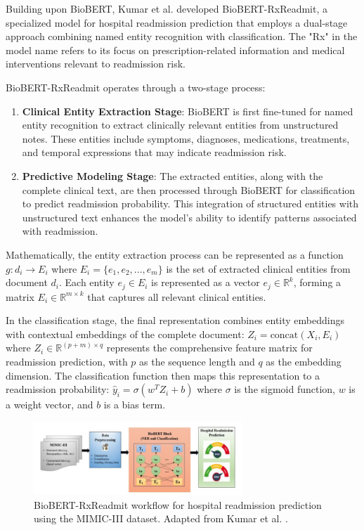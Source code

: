 \documentclass[3p,times,procedia]{elsarticle}
\begin{document}
Building upon BioBERT, Kumar et al. \cite{Kumar2025} developed BioBERT-RxReadmit, a specialized model for hospital readmission prediction that employs a dual-stage approach combining named entity recognition with classification. The "Rx" in the model name refers to its focus on prescription-related information and medical interventions relevant to readmission risk.

BioBERT-RxReadmit operates through a two-stage process:

\begin{enumerate}
    \item \textbf{Clinical Entity Extraction Stage}: BioBERT is first fine-tuned for named entity recognition to extract clinically relevant entities from unstructured notes. These entities include symptoms, diagnoses, medications, treatments, and temporal expressions that may indicate readmission risk.
    
    \item \textbf{Predictive Modeling Stage}: The extracted entities, along with the complete clinical text, are then processed through BioBERT for classification to predict readmission probability. This integration of structured entities with unstructured text enhances the model's ability to identify patterns associated with readmission.
\end{enumerate}

Mathematically, the entity extraction process can be represented as a function $g: d_i \rightarrow E_i$ where $E_i = \{e_1, e_2, ..., e_m\}$ is the set of extracted clinical entities from document $d_i$. Each entity $e_j \in E_i$ is represented as a vector $e_j \in \mathbb{R}^k$, forming a matrix $E_i \in \mathbb{R}^{m \times k}$ that captures all relevant clinical entities.

In the classification stage, the final representation combines entity embeddings with contextual embeddings of the complete document: $Z_i = \text{concat}(X_i, E_i)$ where $Z_i \in \mathbb{R}^{(p + m) \times q}$ represents the comprehensive feature matrix for readmission prediction, with $p$ as the sequence length and $q$ as the embedding dimension. The classification function then maps this representation to a readmission probability: $\hat{y}_i = \sigma(w^T Z_i + b)$ where $\sigma$ is the sigmoid function, $w$ is a weight vector, and $b$ is a bias term.

\begin{figure}[h]
\centering
\includegraphics[width=0.7\textwidth]{images/biobert_rxreadmit.png}
\caption{BioBERT-RxReadmit workflow for hospital readmission prediction using the MIMIC-III dataset. Adapted from Kumar et al. \cite{Kumar2025}.}
\label{fig:biobert_rxreadmit}
\end{figure}
\end{document}
